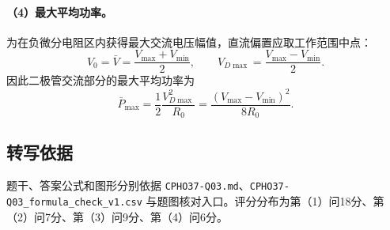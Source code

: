 \paragraph{（4）最大平均功率。} 为在负微分电阻区内获得最大交流电压幅值，直流偏置应取工作范围中点：
\[
\boxed{V_0=\bar V=\frac{V_{\max}+V_{\min}}2,\qquad
V_{D\max}=\frac{V_{\max}-V_{\min}}2.}
\]
因此二极管交流部分的最大平均功率为
\[
\boxed{\bar P_{\max}=\frac12\frac{V_{D\max}^2}{R_0}
=\frac{(V_{\max}-V_{\min})^2}{8R_0}.}
\]

\subsection{转写依据}
题干、答案公式和图形分别依据 \texttt{CPHO37-Q03.md}、\texttt{CPHO37-Q03\_formula\_check\_v1.csv} 与题图核对入口。评分分布为第（1）问18分、第（2）问7分、第（3）问9分、第（4）问6分。
